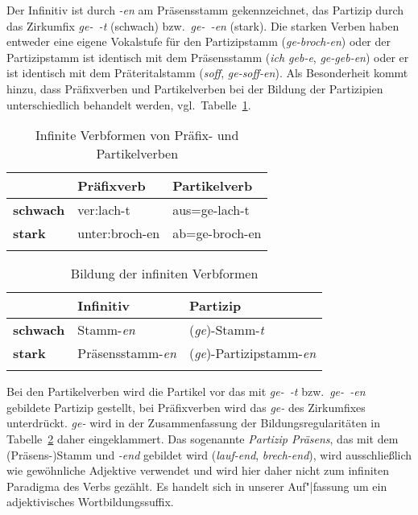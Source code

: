 Der Infinitiv ist durch \textit{-en} am Präsensstamm gekennzeichnet, das Partizip durch das Zirkumfix \textit{ge-~-t} (schwach) bzw.\ \textit{ge-~-en} (stark).
Die starken Verben haben entweder eine eigene Vokalstufe für den Partizipstamm (\textit{ge-broch-en}) oder der Partizipstamm ist identisch mit dem Präsensstamm (\textit{ich geb-e}, \textit{ge-geb-en}) oder er ist identisch mit dem Präteritalstamm (\textit{soff}, \textit{ge-soff-en}).
Als Besonderheit kommt hinzu, dass Präfixverben und Partikelverben bei der Bildung der Partizipien unterschiedlich behandelt werden, vgl.\ Tabelle~\ref{tab:infiniteformen102}.


\begin{table}[!htbp]
  \centering
  \begin{tabular}{lll}
    \lsptoprule
    & \textbf{Präfixverb} & \textbf{Partikelverb} \\
    \midrule
    \textbf{schwach} & ver:lach-t & aus=ge-lach-t \\
    \textbf{stark} & unter:broch-en & ab=ge-broch-en\\
    \lspbottomrule
  \end{tabular}
  \caption{Infinite Verbformen von Präfix- und Partikelverben}
  \label{tab:infiniteformen102}
\end{table}

\begin{table}[!htbp]
  \centering
  \begin{tabular}{lll}
    \lsptoprule
    & \textbf{Infinitiv} & \textbf{Partizip} \\
    \midrule
    \textbf{schwach} & Stamm-\textit{en} & (\textit{ge})-Stamm-\textit{t} \\
    \textbf{stark} & Präsensstamm-\textit{en} & (\textit{ge})-Partizipstamm-\textit{en} \\
    \lspbottomrule
  \end{tabular}
  \caption{Bildung der infiniten Verbformen}
  \label{tab:infiniteformen103}
\end{table}

Bei den Partikelverben wird die Partikel vor das mit \textit{ge-~-t} bzw.\ \textit{ge-~-en} gebildete Partizip gestellt, bei Präfixverben wird das \textit{ge-} des Zirkumfixes unterdrückt.
\textit{ge-} wird in der Zusammenfassung der Bildungsregularitäten in Tabelle~\ref{tab:infiniteformen103} daher eingeklammert.
Das sogenannte \textit{Partizip Präsens}, das mit dem (Präsens-)Stamm und \textit{-end} gebildet wird (\textit{lauf-end}, \textit{brech-end}), wird ausschließlich wie gewöhnliche Adjektive verwendet und wird hier daher nicht zum infiniten Paradigma des Verbs gezählt.
Es handelt sich in unserer Auf"|fassung um ein adjektivisches Wortbildungssuffix.

